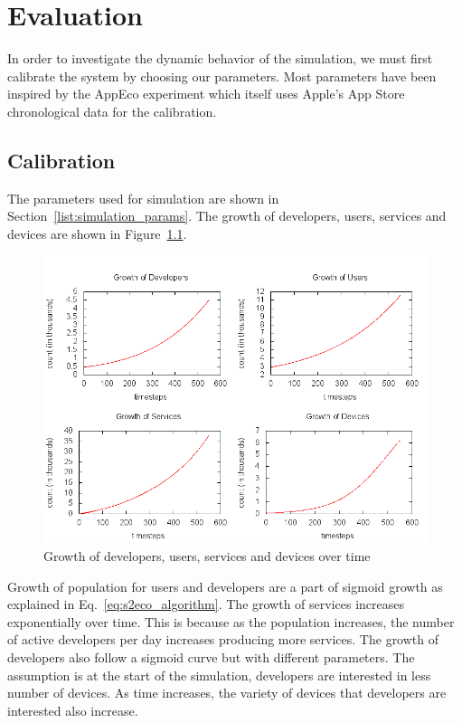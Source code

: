\chapter{Evaluation}

In order to investigate the dynamic behavior of the simulation, we must first calibrate the system by choosing our parameters. Most parameters have been inspired by the AppEco experiment which itself uses Apple's App Store chronological data for the calibration.

\section{Calibration}

The parameters used for simulation are shown in Section~\ref{list:simulation_params}. The growth of developers, users, services and devices are shown in Figure~\ref{fig:growth_dev_user_services}.

\begin{figure}[!htb]
  \centering
  \includegraphics[width=14cm]{figures/dev_user_service_device.png}
  \caption{Growth of developers, users, services and devices over time}
  \label{fig:growth_dev_user_services}
\end{figure}

Growth of population for users and developers are a part of sigmoid growth as explained in Eq.~\ref{eq:s2eco_algorithm}. The growth of services increases exponentially over time. This is because as the population increases, the number of active developers per day increases producing more services. The growth of developers also follow a sigmoid curve but with different parameters. The assumption is at the start of the simulation, developers are interested in less number of devices. As time increases, the variety of devices that developers are interested also increase.

